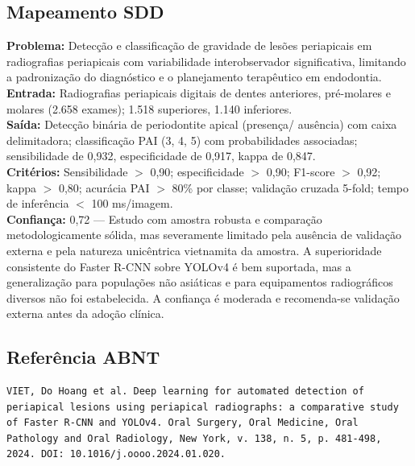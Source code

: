 \subsection{Mapeamento SDD}
\textbf{Problema:} Detecção e classificação de gravidade de lesões
periapicais em radiografias periapicais com variabilidade
interobservador significativa, limitando a padronização do
diagnóstico e o planejamento terapêutico em endodontia. \\
\textbf{Entrada:} Radiografias periapicais digitais de dentes
anteriores, pré-molares e molares (2.658 exames); 1.518 superiores,
1.140 inferiores. \\
\textbf{Saída:} Detecção binária de periodontite apical (presença/
ausência) com caixa delimitadora; classificação PAI (3, 4, 5) com
probabilidades associadas; sensibilidade de 0,932, especificidade
de 0,917, kappa de 0,847. \\
\textbf{Critérios:} Sensibilidade $>$ 0,90; especificidade $>$ 0,90;
F1-score $>$ 0,92; kappa $>$ 0,80; acurácia PAI $>$ 80\% por classe;
validação cruzada 5-fold; tempo de inferência $<$ 100 ms/imagem. \\
\textbf{Confiança:} 0,72 — Estudo com amostra robusta e comparação
metodologicamente sólida, mas severamente limitado pela ausência de
validação externa e pela natureza unicêntrica vietnamita da amostra.
A superioridade consistente do Faster R-CNN sobre YOLOv4 é bem
suportada, mas a generalização para populações não asiáticas e para
equipamentos radiográficos diversos não foi estabelecida. A
confiança é moderada e recomenda-se validação externa antes da
adoção clínica.

\subsection{Referência ABNT}
\begin{verbatim}
VIET, Do Hoang et al. Deep learning for automated detection of
periapical lesions using periapical radiographs: a comparative study
of Faster R-CNN and YOLOv4. Oral Surgery, Oral Medicine, Oral
Pathology and Oral Radiology, New York, v. 138, n. 5, p. 481-498,
2024. DOI: 10.1016/j.oooo.2024.01.020.
\end{verbatim}
\endinput

